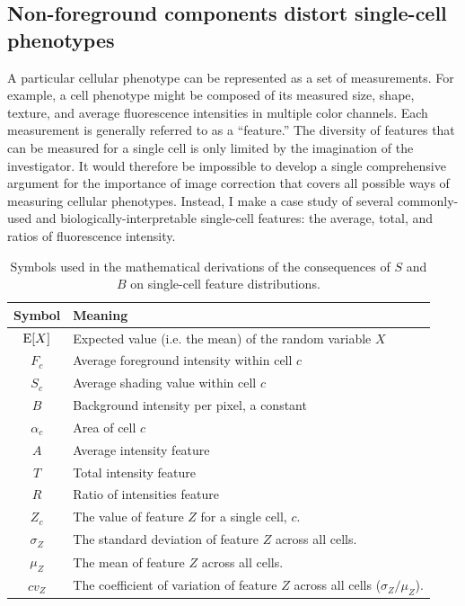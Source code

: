 \subsection{Non-foreground components distort single-cell phenotypes}
\label{imaging:distortion}


A particular cellular phenotype can be represented
as a set of measurements.
For example, a cell phenotype might be composed of
its measured size, shape, texture,
and average fluorescence intensities in multiple
color channels. Each measurement is
generally referred to as a ``feature.'' The diversity
of features that can be measured
for a  single cell is only limited by the imagination
of the investigator. It would therefore
be impossible to develop a single
comprehensive argument for the importance
of image correction that covers all possible
ways of measuring cellular phenotypes.
Instead, I make a case study of several
commonly-used and biologically-interpretable
single-cell features: the average, total,
and ratios of fluorescence intensity.


    \begin{table}[!bt]
    \caption[Table of symbols for average, total, and ratiometric features.]
    {Symbols used in the mathematical derivations of the consequences of $S$
    and $B$ on single-cell feature distributions.}
    \label{table:imaging:symbols}
    \centering
    \begin{tabular}{cl}
    \hline
    Symbol & Meaning \\ \hline
    $\mathrm{E}[X]$   & Expected value (i.e. the mean) of the random variable $X$ \\
    $F_c$	 & Average foreground intensity within cell $c$ \\
    $S_c$	 & Average shading value within cell $c$ \\
    $B$	     & Background intensity per pixel, a constant\\
    $\alpha_c$ & Area of cell $c$ \\
    $A$	     & Average intensity feature \\
    $T$	     & Total intensity feature \\
    $R$	     & Ratio of intensities feature \\
    $Z_c$    & The value of feature $Z$ for a single cell, $c$.\\
    $\sigma_Z$ & The standard deviation of feature $Z$ across all cells. \\
    $\mu_Z$    & The mean of feature $Z$ across all cells. \\
    $cv_Z$     & The coefficient of variation of feature $Z$ across all cells  ($\sigma_Z/\mu_Z$). \\
    \hline
    \end{tabular}
    \end{table}


